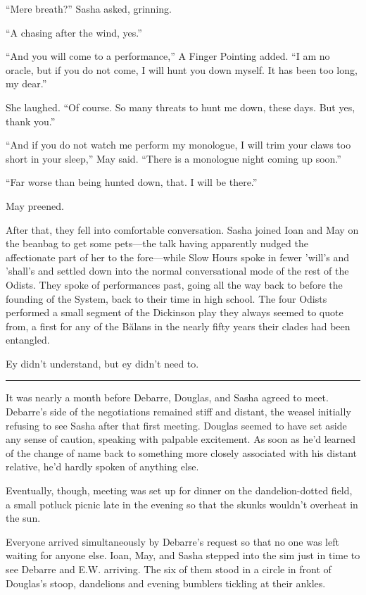 ``Mere breath?'' Sasha asked, grinning.

``A chasing after the wind, yes.''

``And you will come to a performance,'' A Finger Pointing added. ``I am no oracle, but if you do not come, I will hunt you down myself. It has been too long, my dear.''

She laughed. ``Of course. So many threats to hunt me down, these days. But yes, thank you.''

``And if you do not watch me perform my monologue, I will trim your claws too short in your sleep,'' May said. ``There is a monologue night coming up soon.''

``Far worse than being hunted down, that. I will be there.''

May preened.

After that, they fell into comfortable conversation. Sasha joined Ioan and May on the beanbag to get some pets—the talk having apparently nudged the affectionate part of her to the fore—while Slow Hours spoke in fewer 'will's and 'shall's and settled down into the normal conversational mode of the rest of the Odists. They spoke of performances past, going all the way back to before the founding of the System, back to their time in high school. The four Odists performed a small segment of the Dickinson play they always seemed to quote from, a first for any of the Bălans in the nearly fifty years their clades had been entangled.

Ey didn't understand, but ey didn't need to.

\begin{center}\rule{0.5\linewidth}{0.5pt}\end{center}

It was nearly a month before Debarre, Douglas, and Sasha agreed to meet. Debarre's side of the negotiations remained stiff and distant, the weasel initially refusing to see Sasha after that first meeting. Douglas seemed to have set aside any sense of caution, speaking with palpable excitement. As soon as he'd learned of the change of name back to something more closely associated with his distant relative, he'd hardly spoken of anything else.

Eventually, though, meeting was set up for dinner on the dandelion-dotted field, a small potluck picnic late in the evening so that the skunks wouldn't overheat in the sun.

Everyone arrived simultaneously by Debarre's request so that no one was left waiting for anyone else. Ioan, May, and Sasha stepped into the sim just in time to see Debarre and E.W. arriving. The six of them stood in a circle in front of Douglas's stoop, dandelions and evening bumblers tickling at their ankles.


